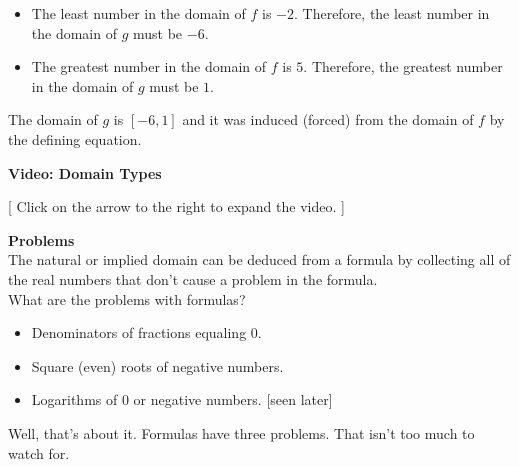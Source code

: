 \documentclass{ximera}
\begin{document}
\begin{enumerate}
\begin{itemize}
\item The least number in the domain of $f$ is $-2$.  Therefore, the least number in the domain of $g$ must be $-6$.
\item The greatest number in the domain of $f$ is $5$.  Therefore, the greatest number in the domain of $g$ must be $1$.
\end{itemize} 

The domain of $g$ is $[-6, 1]$ and it was induced (forced) from the domain of $f$ by the defining equation.


\end{enumerate}





\begin{explanation} \textbf{Video: Domain Types}

[ Click on the arrow to the right to expand the video. ]
\begin{expandable} 

\begin{center}
\end{center}

\end{expandable}
\end{explanation}







\begin{warning} \textbf{\textcolor{red!70!darkgray}{Problems}}   \\

The natural or implied domain can be deduced from a formula by collecting all of the real numbers that don't cause a problem in the formula. \\

What are the problems with formulas?

\begin{itemize}
\item  Denominators of fractions equaling $0$. \\
\item  Square (even) roots of negative numbers.    \\
\item  Logarithms of $0$ or negative numbers.  [seen later] 
\end{itemize}

Well, that's about it.  Formulas have three problems.  That isn't too much to watch for.


\end{warning}
\end{document}
